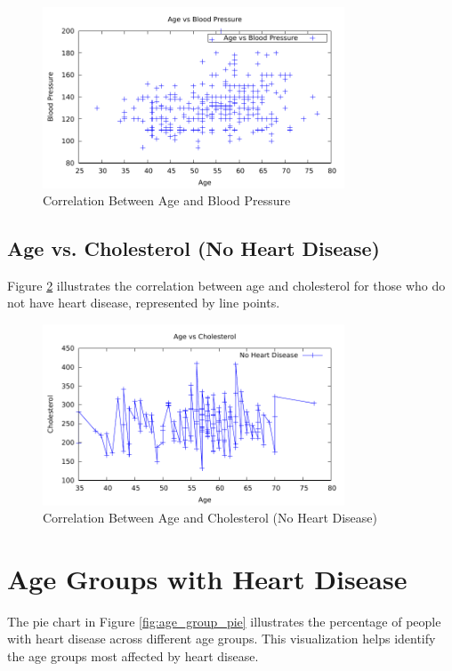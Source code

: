 \documentclass{article}
\begin{document}
	\begin{figure}[h]
		\centering
		\includegraphics[width=0.8\textwidth]{4b.pdf}
		\caption{Correlation Between Age and Blood Pressure}
		\label{fig:age_vs_bp}
	\end{figure}
	
	\subsection{Age vs. Cholesterol (No Heart Disease)}
	Figure \ref{fig:age_vs_cholesterol} illustrates the correlation between age and cholesterol for those who do not have heart disease, represented by line points.
	
	\begin{figure}[h]
		\centering
		\includegraphics[width=0.8\textwidth]{4c.pdf}
		\caption{Correlation Between Age and Cholesterol (No Heart Disease)}
		\label{fig:age_vs_cholesterol}
	\end{figure}
	
	\section{Age Groups with Heart Disease}
	The pie chart in Figure \ref{fig:age_group_pie} illustrates the percentage of people with heart disease across different age groups. This visualization helps identify the age groups most affected by heart disease.
	
\end{document}
